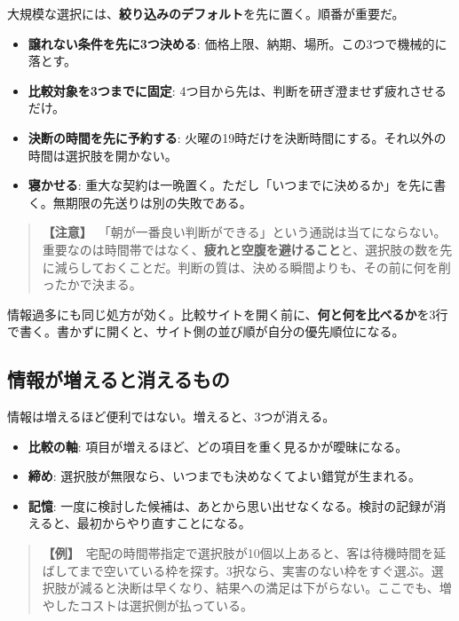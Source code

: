 \documentclass{article}
\begin{document}
大規模な選択には、\textbf{絞り込みのデフォルト}を先に置く。順番が重要だ。

\begin{itemize}
\item \textbf{譲れない条件を先に3つ決める}: 価格上限、納期、場所。この3つで機械的に落とす。
\item \textbf{比較対象を3つまでに固定}: 4つ目から先は、判断を研ぎ澄ませず疲れさせるだけ。
\item \textbf{決断の時間を先に予約する}: 火曜の19時だけを決断時間にする。それ以外の時間は選択肢を開かない。
\item \textbf{寝かせる}: 重大な契約は一晩置く。ただし「いつまでに決めるか」を先に書く。無期限の先送りは別の失敗である。
\end{itemize}

\begin{quote}
\textbf{【注意】}\ 「朝が一番良い判断ができる」という通説は当てにならない。重要なのは時間帯ではなく、\textbf{疲れと空腹を避けること}と、選択肢の数を先に減らしておくことだ。判断の質は、決める瞬間よりも、その前に何を削ったかで決まる。
\end{quote}

情報過多にも同じ処方が効く。比較サイトを開く前に、\textbf{何と何を比べるか}を3行で書く。書かずに開くと、サイト側の並び順が自分の優先順位になる。

\subsection{情報が増えると消えるもの}

情報は増えるほど便利ではない。増えると、3つが消える。

\begin{itemize}
\item \textbf{比較の軸}: 項目が増えるほど、どの項目を重く見るかが曖昧になる。
\item \textbf{締め}: 選択肢が無限なら、いつまでも決めなくてよい錯覚が生まれる。
\item \textbf{記憶}: 一度に検討した候補は、あとから思い出せなくなる。検討の記録が消えると、最初からやり直すことになる。
\end{itemize}

\begin{quote}
\textbf{【例】}\ 宅配の時間帯指定で選択肢が10個以上あると、客は待機時間を延ばしてまで空いている枠を探す。3択なら、実害のない枠をすぐ選ぶ。選択肢が減ると決断は早くなり、結果への満足は下がらない。ここでも、増やしたコストは選択側が払っている。
\end{quote}
\end{document}
